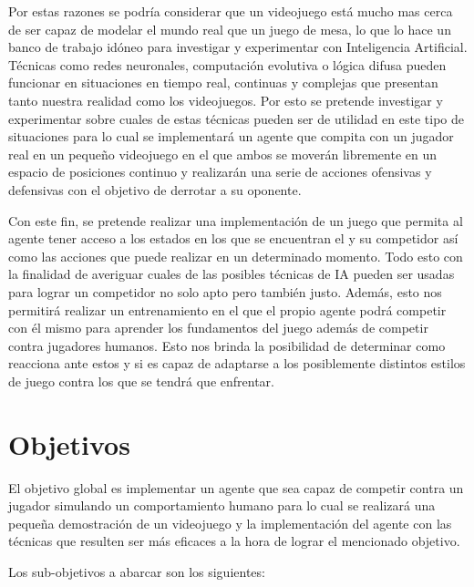 \bigskip

Por estas razones se podría considerar que un videojuego está mucho mas cerca de ser capaz de modelar el mundo real que un juego de mesa, lo que lo hace un banco de trabajo idóneo para investigar y experimentar con Inteligencia Artificial. Técnicas como redes neuronales, computación evolutiva o lógica difusa pueden funcionar en situaciones en tiempo real, continuas y complejas que presentan tanto nuestra realidad como los videojuegos. Por esto se pretende investigar y experimentar sobre cuales de estas técnicas pueden ser de utilidad en este tipo de situaciones para lo cual se implementará un agente que compita con un jugador real en un pequeño videojuego en el que ambos se moverán libremente en un espacio de posiciones continuo y realizarán una serie de acciones ofensivas y defensivas con el objetivo de derrotar a su oponente.

\bigskip

Con este fin, se pretende realizar una implementación de un juego que permita al agente tener acceso a los estados en los que se encuentran el y su competidor así como las acciones que puede realizar en un determinado momento. Todo esto con la finalidad de averiguar cuales de las posibles técnicas de IA pueden ser usadas para lograr un competidor no solo apto pero también justo. Además, esto nos permitirá realizar un entrenamiento en el que el propio agente podrá competir con él mismo para aprender los fundamentos del juego además de competir contra jugadores humanos. Esto nos brinda la posibilidad de determinar como reacciona ante estos y si es capaz de adaptarse a los posiblemente distintos estilos de juego contra los que se tendrá que enfrentar.

\section{Objetivos}

El objetivo global es implementar un agente que sea capaz de competir contra un jugador simulando un comportamiento humano para lo cual se realizará una pequeña demostración de un videojuego y la implementación del agente con las técnicas que resulten ser más eficaces a la hora de lograr el mencionado objetivo.

\bigskip

Los sub-objetivos a abarcar son los siguientes:

